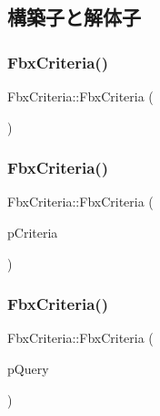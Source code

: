 \subsection{構築子と解体子}
\mbox{\label{class_fbx_criteria_a6fad9ae6073408c66b145a5fe0bb000f}} 
\subsubsection{\texorpdfstring{Fbx\+Criteria()}{FbxCriteria()}\hspace{0.1cm}{\footnotesize\ttfamily [1/3]}}
{\footnotesize\ttfamily Fbx\+Criteria\+::\+Fbx\+Criteria (\begin{DoxyParamCaption}{ }\end{DoxyParamCaption})}

\mbox{\label{class_fbx_criteria_afa1c0c24262d51ccda5bb559afa4ac33}} 
\subsubsection{\texorpdfstring{Fbx\+Criteria()}{FbxCriteria()}\hspace{0.1cm}{\footnotesize\ttfamily [2/3]}}
{\footnotesize\ttfamily Fbx\+Criteria\+::\+Fbx\+Criteria (\begin{DoxyParamCaption}\item[{const \hyperlink{class_fbx_criteria}{Fbx\+Criteria} \&}]{p\+Criteria }\end{DoxyParamCaption})}

\mbox{\label{class_fbx_criteria_ad30265af41804a2e45d2705a837e226c}} 
\subsubsection{\texorpdfstring{Fbx\+Criteria()}{FbxCriteria()}\hspace{0.1cm}{\footnotesize\ttfamily [3/3]}}
{\footnotesize\ttfamily Fbx\+Criteria\+::\+Fbx\+Criteria (\begin{DoxyParamCaption}\item[{\hyperlink{class_fbx_query}{Fbx\+Query} $\ast$}]{p\+Query }\end{DoxyParamCaption})}

